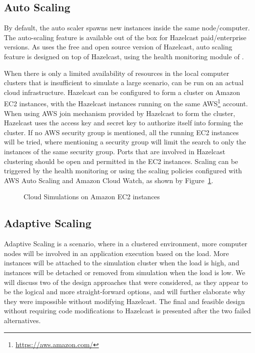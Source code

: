 \subsection{Auto Scaling}
By default, the  auto scaler spawns new instances inside the same node/computer. The auto-scaling feature is available out of the box for Hazelcast paid/enterprise versions. As  uses the free and open source version of Hazelcast, auto scaling feature is designed on top of Hazelcast, using the health monitoring module of . 

When there is only a limited availability of resources in the local computer clusters that is insufficient to simulate a large scenario,  can be run on an actual cloud infrastructure. Hazelcast can be configured to form a cluster on Amazon EC2 instances, with the Hazelcast instances running on the same AWS\footnote{\url{https://aws.amazon.com/}} account. When using AWS join mechanism provided by Hazelcast to form the cluster, Hazelcast uses the access key and secret key to authorize itself into forming the cluster. If no AWS security group is mentioned, all the running EC2 instances will be tried, where mentioning a security group will limit the search to only the instances of the same security group. Ports that are involved in Hazelcast clustering should be open and permitted in the EC2 instances. Scaling can be triggered by the  health monitoring or using the scaling policies configured with AWS Auto Scaling and Amazon Cloud Watch, as shown by Figure~\ref{fig:aws}.

\begin{figure}[!h]
\begin{center}
\end{center}
 \caption{Cloud Simulations on Amazon EC2 instances}
 \label{fig:aws}
\end{figure}

\subsection{Adaptive Scaling}
Adaptive Scaling is a scenario, where in a clustered environment, more computer nodes will be involved in an application execution based on the load. More instances will be attached to the simulation cluster when the load is high, and instances will be detached or removed from simulation when the load is low. We will discuss two of the design approaches that were considered, as they appear to be the logical and more straight-forward options, and will further elaborate why they were impossible without modifying Hazelcast. The final and feasible design without requiring code modifications to Hazelcast is presented after the two failed alternatives.

